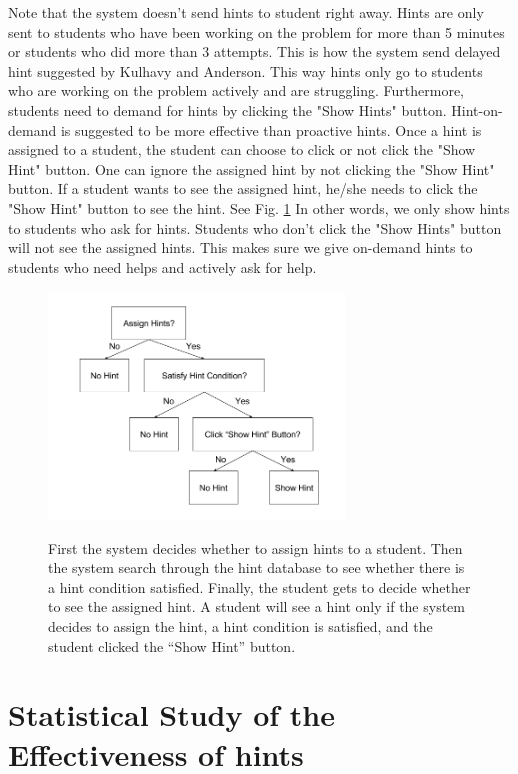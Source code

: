 \documentclass{llncs}
\begin{document}
Note that the system doesn't send hints to student right away. Hints are only sent to students who have been working on the problem for more than 5 minutes or students who did more than 3 attempts. This is how the system send delayed hint suggested by Kulhavy and Anderson\cite{Kulhavy1972}. This way hints only go to students who are working on the problem actively and are struggling. Furthermore, students need to demand for hints by clicking the "Show Hints" button. Hint-on-demand is suggested to be more effective than proactive hints\cite{Razzaq2010}. Once a hint is assigned to a student, the student can choose to click or not click the "Show Hint" button. One can ignore the assigned hint by not clicking the "Show Hint" button. If a student wants to see the assigned hint, he/she needs to click the "Show Hint" button to see the hint. See Fig. \ref{fig:show_hint} In other words, we only show hints to students who ask for hints. Students who don't click the "Show Hints" button will not see the assigned hints. This makes sure we give on-demand hints to students who need helps and actively ask for help. 

\begin{figure}[ht]
   \centering
   \caption{First the system decides whether to assign hints to a student. Then the system search through the hint database to see whether there is a hint condition satisfied. Finally, the student gets to decide whether to see the assigned hint. A student will see a hint only if the system decides to assign the hint, a hint condition is satisfied, and the student clicked the ``Show Hint'' button.}
   \includegraphics[width=0.7\textwidth]{image/Show_Hint.png}
   \label{fig:show_hint}
\end{figure}


\section{Statistical Study of the Effectiveness of hints}
\end{document}
